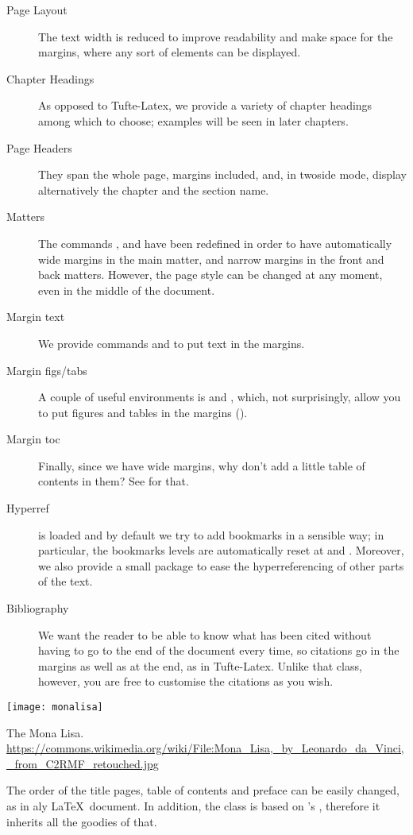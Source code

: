 \begin{description}
	\item[Page Layout] The text width is reduced to improve readability 
	and make space for the margins, where any sort of elements can be 
	displayed.
	\item[Chapter Headings] As opposed to Tufte-Latex, we provide a 
	variety of chapter headings among which to choose; examples will be 
	seen in later chapters.
	\item[Page Headers] They span the whole page, margins included, and, 
	in twoside mode, display alternatively the chapter and the section 
	name.
	\item[Matters] The commands , 
	 and  have been redefined in 
	order to have automatically wide margins in the main matter, and 
	narrow margins in the front and back matters. However, the page 
	style can be changed at any moment, even in the middle of the 
	document.
	\item[Margin text] We provide commands  and 
	 to put text in the 
	margins.
	\item[Margin figs/tabs] A couple of useful environments is 
	 and , which, not 
	surprisingly, allow you to put figures and tables in the margins 
	(\cfr {}).
	\item[Margin toc] Finally, since we have wide margins, why don't add 
	a little table of contents in them? See  for 
	that.
	\item[Hyperref]  is loaded and by default we try 
	to add bookmarks in a sensible way; in particular, the bookmarks 
	levels are automatically reset at  and 
	. Moreover, we also provide a small package to 
	ease the hyperreferencing of other parts of the text.
	\item[Bibliography] We want the reader to be able to know what has 
	been cited without having to go to the end of the document every 
	time, so citations go in the margins as well as at the end, as in 
	Tufte-Latex. Unlike that class, however, you are free to customise 
	the citations as you wish.
\end{description}

\begin{marginfigure}[-5.5cm]
	\texttt{[image: monalisa]}
	\caption[The Mona Lisa]{The Mona Lisa.\\ 
	\url{https://commons.wikimedia.org/wiki/File:Mona_Lisa,_by_Leonardo_da_Vinci,_from_C2RMF_retouched.jpg}}
\end{marginfigure}

The order of the title pages, table of contents and preface can be 
easily changed, as in aly \LaTeX\ document. In addition, the class is 
based on \KOMAScript's , therefore it inherits all the 
goodies of that.


